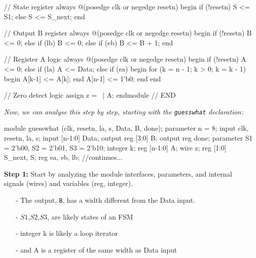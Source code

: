\documentclass[12pt,openany]{book}
\begin{document}
\begin{minipage}[htp]{1\textwidth}
	\begin{vhdl}
// State register
always @(posedge clk or negedge resetn) begin
if (!resetn) S <= S1;
else S <= S_next;
end

// Output B register
always @(posedge clk or negedge resetn) begin
if (!resetn) B <= 0;
else if (lb) B <= 0;
else if (eb) B <= B + 1;
end

// Register A logic
always @(posedge clk or negedge resetn) begin
if (!resetn) A <= 0;
else if (la) A <= Data;
else if (ea) begin
for (k = n - 1; k > 0; k = k - 1) begin
A[k-1] <= A[k];
end
A[n-1] <= 1'b0;
end
end

// Zero detect logic
assign z = ~| A;
endmodule
// END
	\end{vhdl}
\end{minipage}
\textit{Now, we can analyse this step by step, starting with the \texttt{guesswhat} declaration:}\newline 
\begin{minipage}[htp]{0.45\textwidth}
\begin{vhdl}
module guesswhat (clk, resetn, la, s, Data, B, done);
parameter n = 8;
input clk, resetn, la, s;
input [n-1:0] Data;
output reg [3:0] B;
output reg done;
parameter S1 = 2'b00, S2 = 2'b01, S3 = 2'b10;
integer k;
reg [n-1:0] A;
wire z;
reg [1:0] S_next, S;
reg ea, eb, lb;
//continues...
\end{vhdl}
\end{minipage}
\hfill
\vline
\hfill
\begin{minipage}[htp]{0.45\textwidth}
\begin{justify}
\textbf{Step 1:} Start by analyzing the module interfaces, parameters, and internal signals (wires) and variables (reg, integer).
\begin{itemize}
	\item[-] The output, \texttt{B}, has a width different from the Data input.
	\item[-] $S1$,$S2$,$S3$, are likely states of an FSM
	\item[-] integer k is likely a loop iterator
	\item[-] and A is a register of the same width as Data input
\end{itemize}
\end{justify}
\end{minipage}
\newline
\end{document}
